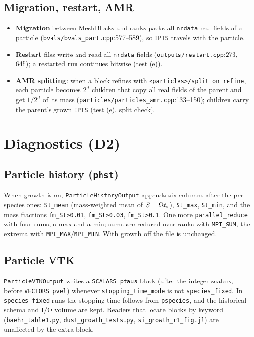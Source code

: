 \documentclass[11pt]{article}
\newcommand{\code}[1]{\texttt{#1}}
\newcommand{\file}[1]{\texttt{\small #1}}
\newcommand{\fn}[1]{\texttt{\small #1}}
\newcommand{\St}{S}
\newcommand{\ts}{t_{\rm s}}
\begin{document}
\subsection{Migration, restart, AMR}
\begin{itemize}
\item \textbf{Migration} between MeshBlocks and ranks packs all \code{nrdata} real
  fields of a particle (\file{bvals/bvals\_part.cpp}:577--589), so \code{IPTS} travels
  with the particle.
\item \textbf{Restart} files write and read all \code{nrdata} fields
  (\file{outputs/restart.cpp}:273, 645); a restarted run continues bitwise (test (e)).
\item \textbf{AMR splitting}: when a block refines with
  \code{<particles>/split\_on\_refine}, each particle becomes $2^d$ children that copy
  all real fields of the parent and get $1/2^d$ of its mass
  (\file{particles/particles\_amr.cpp}:133--150); children carry the parent's grown
  \code{IPTS} (test (e), split check).
\end{itemize}

\section{Diagnostics (D2)}\label{sec:diag}

\subsection{Particle history (\code{phst})}
When growth is on, \fn{ParticleHistoryOutput} appends six columns after the
per-species ones: \code{St\_mean} (mass-weighted mean of $\St=\Omega\ts$),
\code{St\_max}, \code{St\_min}, and the mass fractions \code{fm\_St>0.01},
\code{fm\_St>0.03}, \code{fm\_St>0.1}. One more \code{parallel\_reduce} with four sums,
a max and a min; sums are reduced over ranks with \code{MPI\_SUM}, the extrema with
\code{MPI\_MAX}/\code{MPI\_MIN}. With growth off the file is unchanged.

\subsection{Particle VTK}
\fn{ParticleVTKOutput} writes a \code{SCALARS ptaus} block (after the integer scalars,
before \code{VECTORS pvel}) whenever \code{stopping\_time\_mode} is not
\code{species\_fixed}. In \code{species\_fixed} runs the stopping time follows from
\code{pspecies}, and the historical schema and I/O volume are kept. Readers that locate
blocks by keyword (\file{baehr\_table1.py}, \file{dust\_growth\_tests.py},
\file{si\_growth\_r1\_fig.jl}) are unaffected by the extra block.
\end{document}
